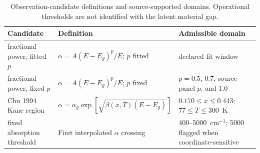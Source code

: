 \begin{table}[t]
\centering
\caption{Observation-candidate definitions and source-supported domains. Operational thresholds are not identified with the latent material gap.}
\label{tab:candidate-definitions}
\begin{tabular}{p{}p{}p{}}
\toprule
Candidate & Definition & Admissible domain \\
\midrule
fractional power, fitted $p$ & $\alpha=A(E-E_g)^p/E$; $p$ fitted & declared fit window \\
fractional power, fixed $p$ & $\alpha=A(E-E_g)^p/E$; $p$ fixed & $p=0.5$, $0.7$, source-panel $p$, and $1.0$ \\
Chu 1994 Kane region & $\alpha=\alpha_g\exp[\sqrt{\beta(x,T)(E-E_g)}]$ & $0.170\leq x\leq0.443$; $77\leq T\leq300$~K \\
fixed absorption threshold & First interpolated $\alpha$ crossing & 400--5000~cm$^{-1}$; 5000 flagged when coordinate-sensitive \\
\bottomrule
\end{tabular}
\end{table}
